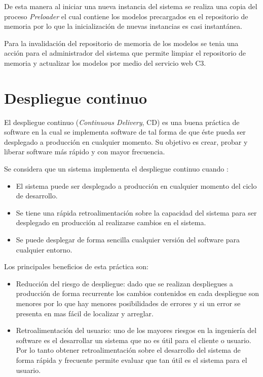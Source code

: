 De esta manera al iniciar una nueva instancia del sistema se realiza una copia del
proceso \textit{Preloader} el cual contiene los modelos precargados en el
repositorio de memoria por lo que la inicialización de nuevas instancias es casi
instantánea.


Para la invalidación del repositorio de memoria de los modelos se tenia una acción
para el administrador del sistema que permite limpiar el repositorio de memoria y
actualizar los modelos por medio del servicio web C3.



\section{Despliegue continuo}

El despliegue continuo (\textit{Continuous Delivery}, CD) es una buena práctica de
software en la cual se implementa software de tal forma de que éste pueda ser
desplegado a producción en cualquier momento\cite{27_martin_fowler_cd}. Su objetivo
es crear, probar y liberar software más rápido y con mayor frecuencia.

\vspace{2.5mm}

Se considera que un sistema implementa el despliegue continuo cuando
\cite{27_martin_fowler_cd}:
\begin{itemize}
\item El sistema puede ser desplegado a producción en cualquier momento del
  ciclo de desarrollo.
\item Se tiene una rápida retroalimentación sobre la capacidad del sistema
  para ser desplegado en producción al realizarse cambios en el sistema.
\item Se puede desplegar de forma sencilla cualquier versión del software para
  cualquier entorno.
\end{itemize}

Los principales beneficios de esta práctica son:
\begin{itemize}
\item Reducción del riesgo de despliegue: dado que se realizan despliegues
  a producción de forma recurrente los cambios contenidos en cada despliegue
  son menores por lo que hay menores posibilidades de errores y si un error
  se presenta en mas fácil de localizar y arreglar.
\item Retroalimentación del usuario: uno de los mayores riesgos en la ingeniería
  del software es el desarrollar un sistema que no es útil para el cliente o usuario.
  Por lo tanto obtener retroalimentación sobre el desarrollo del sistema de forma
  rápida y frecuente permite evaluar que tan útil es el sistema para el usuario.
\end{itemize}


